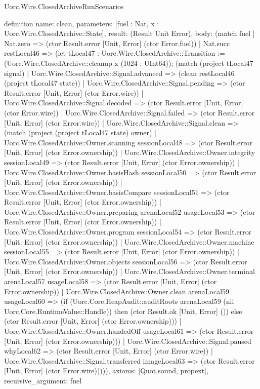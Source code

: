 \begin{lexlean}{Uorc.Wire.ClosedArchiveRunScenarios}
\begin{semanticmodule}
definition{
  name: clean,
  parameters: [fuel : Nat, x : Uorc.Wire.ClosedArchive::State],
  result: (Result Unit Error),
  body: (match fuel
    | Nat.zero => (ctor Result.error [Unit, Error] (ctor Error.fuel))
    | Nat.succ restLocal46 => (let tLocal47 : Uorc.Wire.ClosedArchive::Transition := (Uorc.Wire.ClosedArchive::cleanup x (1024 : UInt64)); (match (project tLocal47 signal)
      | Uorc.Wire.ClosedArchive::Signal.advanced => (clean restLocal46 (project tLocal47 state))
      | Uorc.Wire.ClosedArchive::Signal.pending => (ctor Result.error [Unit, Error] (ctor Error.wire))
      | Uorc.Wire.ClosedArchive::Signal.decoded => (ctor Result.error [Unit, Error] (ctor Error.wire))
      | Uorc.Wire.ClosedArchive::Signal.failed => (ctor Result.error [Unit, Error] (ctor Error.wire))
      | Uorc.Wire.ClosedArchive::Signal.clean => (match (project (project tLocal47 state) owner)
        | Uorc.Wire.ClosedArchive::Owner.scanning sessionLocal48 => (ctor Result.error [Unit, Error] (ctor Error.ownership))
        | Uorc.Wire.ClosedArchive::Owner.integrity sessionLocal49 => (ctor Result.error [Unit, Error] (ctor Error.ownership))
        | Uorc.Wire.ClosedArchive::Owner.basisHash sessionLocal50 => (ctor Result.error [Unit, Error] (ctor Error.ownership))
        | Uorc.Wire.ClosedArchive::Owner.basisCompare sessionLocal51 => (ctor Result.error [Unit, Error] (ctor Error.ownership))
        | Uorc.Wire.ClosedArchive::Owner.preparing arenaLocal52 usageLocal53 => (ctor Result.error [Unit, Error] (ctor Error.ownership))
        | Uorc.Wire.ClosedArchive::Owner.program sessionLocal54 => (ctor Result.error [Unit, Error] (ctor Error.ownership))
        | Uorc.Wire.ClosedArchive::Owner.machine sessionLocal55 => (ctor Result.error [Unit, Error] (ctor Error.ownership))
        | Uorc.Wire.ClosedArchive::Owner.objects sessionLocal56 => (ctor Result.error [Unit, Error] (ctor Error.ownership))
        | Uorc.Wire.ClosedArchive::Owner.terminal arenaLocal57 usageLocal58 => (ctor Result.error [Unit, Error] (ctor Error.ownership))
        | Uorc.Wire.ClosedArchive::Owner.clean arenaLocal59 usageLocal60 => (if (Uorc.Core.HeapAudit::auditRoots arenaLocal59 (nil Uorc.Core.RuntimeValue::Handle)) then (ctor Result.ok [Unit, Error] ()) else (ctor Result.error [Unit, Error] (ctor Error.ownership)))
        | Uorc.Wire.ClosedArchive::Owner.handedOff usageLocal61 => (ctor Result.error [Unit, Error] (ctor Error.ownership)))
      | Uorc.Wire.ClosedArchive::Signal.paused whyLocal62 => (ctor Result.error [Unit, Error] (ctor Error.wire))
      | Uorc.Wire.ClosedArchive::Signal.transferred imageLocal63 => (ctor Result.error [Unit, Error] (ctor Error.wire))))),
  axioms: [Quot.sound, propext],
  recursive_argument: fuel
}


\end{semanticmodule}
\end{lexlean}
